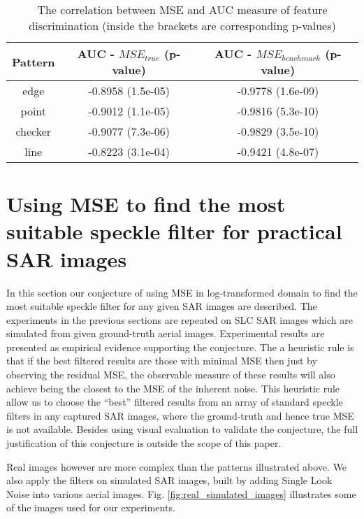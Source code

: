 \documentclass[journal]{IEEEtran}
\begin{document}
\begin{table}
\centering
\begin{tabular}{c|c|c}
Pattern  & AUC - $MSE_{true}$ (p-value) & AUC - $MSE_{benchmark}$ (p-value) \\
\hline
edge & -0.8958 (1.5e-05) &   -0.9778  (1.6e-09) \\
point &     -0.9012   (1.1e-05)   &    -0.9816        (5.3e-10) \\
checker &   -0.9077     (7.3e-06)  &  -0.9829       (3.5e-10) \\
line &      -0.8223     (3.1e-04)  &   -0.9421       (4.8e-07) \\
\hline
\end{tabular}

\caption{The correlation between MSE and AUC measure of feature discrimination (inside the brackets are corresponding p-values)}
\label{tab:mse_auc_corr_coeff}
\end{table}

\section{Using MSE to find the most suitable speckle filter for practical SAR images}
\label{sec:practical_conjecture}

In this section our conjecture of using MSE in log-transformed domain to find the most suitable speckle filter for any given SAR images are described.
The experiments in the previous sections are repeated on SLC SAR images 
	which are simulated from given ground-truth aerial images. 
Experimental results are presented as empirical evidence supporting the conjecture.
The a heuristic rule is that 
	if the best filtered results are those with minimal MSE 
	then just by observing the residual MSE, 
	the observable measure of these results will also achieve 
		being the closest to the MSE of the inherent noise.
This heuristic rule allow us to choose the ``best'' filtered results from an array of standard speckle filters in any captured SAR images, 
	where the ground-truth and hence true MSE is not available.
Besides using visual evaluation to validate the conjecture, 
	the full justification of this conjecture is outside the scope of this paper.

Real images however are more complex than the patterns illustrated above. 
We also apply the filters on simulated SAR images, built by adding Single Look Noise into various aerial images. 
Fig. \ref{fig:real_simulated_images} illustrates some of the images used for our experiments.
\end{document}
